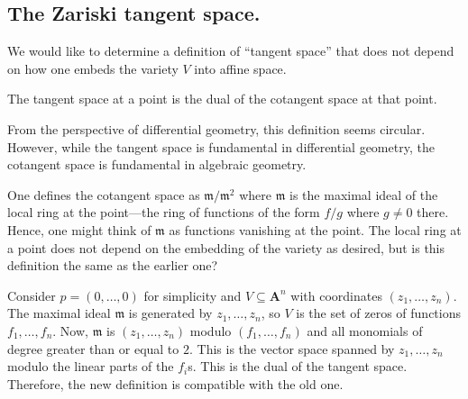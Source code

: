 \documentclass [11 pt, oneside] {article}
\begin{document}
\subsection{The Zariski tangent space.}
We would like to determine a definition of ``tangent space'' that does not depend on how one embeds the variety $V$ into affine space.

 \begin{definition}[ ]\label{}\text{}
The tangent space at a point is the dual of the cotangent space at that point.
\end{definition}

\begin{remark}
	From the perspective of differential geometry, this definition seems circular. However, while the tangent space is fundamental in differential geometry, the cotangent space is fundamental in algebraic geometry.
\end{remark}

One defines the cotangent space as $\mathfrak{m}/\mathfrak{m}^2$ where $\mathfrak{m}$ is the maximal ideal of the local ring at the point---the ring of functions of the form $f/g$ where $g\ne 0$ there. Hence, one might think of $\mathfrak{m}$ as functions vanishing at the point. The local ring at a point does not depend on the embedding of the variety as desired, but is this definition the same as the earlier one?

Consider $p= (0,\hdots, 0)$ for simplicity and $V\subseteq \mathbf{A}^n$ with coordinates $(z_1,\hdots, z_n)$. The maximal ideal $\mathfrak{m}$ is generated by $z_1,\hdots,z_n$, so $V$ is the set of zeros of functions $f_1,\hdots, f_n$. Now, $\mathfrak{m}$ is $(z_1,\hdots, z_n)$ modulo $(f_1,\hdots, f_n)$ and all monomials of degree greater than or equal to $2$. This is the vector space spanned by $z_1,\hdots, z_n$ modulo the linear parts of the $f_i$s. This is the dual of the tangent space. Therefore, the new definition is compatible with the old one.
\end{document}
